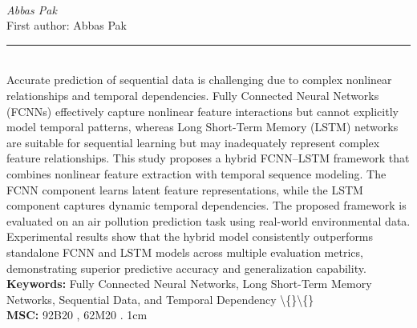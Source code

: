 \documentclass[10pt,twoside]{article}
\begin{document}
\noindent\begin{minipage}[t][\textheight]{\textwidth}
\\[0.35em]
{\itshape Abbas Pak}\\[0.2em]
{\footnotesize First author: Abbas Pak}\\[0.45em]
\noindent\rule{\textwidth}{0.3pt}\\[0.4em]
{\footnotesize  Accurate prediction of sequential data is challenging due to complex nonlinear relationships and temporal dependencies. Fully Connected Neural Networks (FCNNs) effectively capture nonlinear feature interactions but cannot explicitly model temporal patterns, whereas Long Short-Term Memory (LSTM) networks are suitable for sequential learning but may inadequately represent complex feature relationships. This study proposes a hybrid FCNN--LSTM framework that combines nonlinear feature extraction with temporal sequence modeling. The FCNN component learns latent feature representations, while the LSTM component captures dynamic temporal dependencies. The proposed framework is evaluated on an air pollution prediction task using real-world environmental data. Experimental results show that the hybrid model consistently outperforms standalone FCNN and LSTM models across multiple evaluation metrics, demonstrating superior predictive accuracy and generalization capability.}\\[0.4em]
{\footnotesize\bfseries Keywords:} {\footnotesize Fully Connected Neural Networks, Long Short-Term Memory Networks, Sequential Data, and Temporal Dependency \textbackslash\{\}\textbackslash\{\}}\\[0.15em]
{\footnotesize\bfseries MSC:} {\footnotesize 92B20 , 62M20 . 1cm}\\
\vfill
\end{minipage}
\newpage
\end{document}
